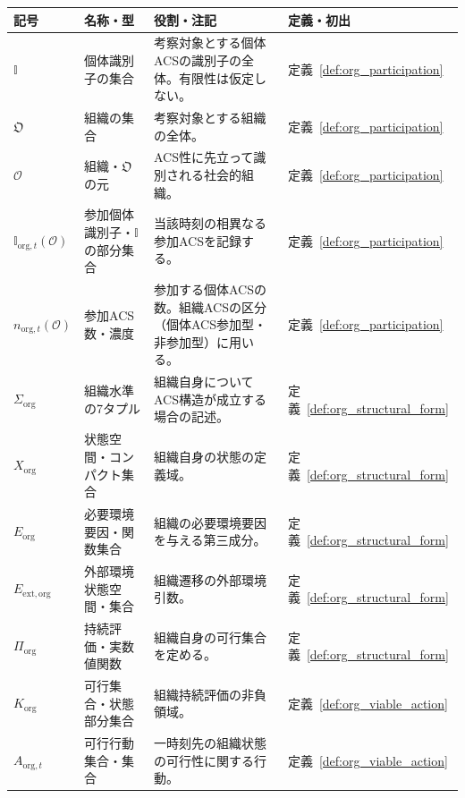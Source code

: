 \begingroup
\small
\setlength{\tabcolsep}{4pt}
\renewcommand{\arraystretch}{1.18}
\begin{longtable}{p{3.0cm} p{3.0cm} p{6.6cm} p{2.0cm}}
\hline
\textbf{記号} & \textbf{名称・型} & \textbf{役割・注記} & \textbf{定義・初出} \\
\hline
\endhead
\hline
\endfoot
$\mathbb{I}$ & 個体識別子の集合 &
考察対象とする個体ACSの識別子の全体。有限性は仮定しない。 &
定義~\ref{def:org_participation} \\[3pt]
$\mathfrak{O}$ & 組織の集合 &
考察対象とする組織の全体。 &
定義~\ref{def:org_participation} \\[3pt]
$\mathcal O$ & 組織・$\mathfrak{O}$ の元 &
ACS性に先立って識別される社会的組織。 &
定義~\ref{def:org_participation} \\[3pt]
$\mathbb{I}_{\mathrm{org},t}(\mathcal O)$ & 参加個体識別子・$\mathbb{I}$ の部分集合 &
当該時刻の相異なる参加ACSを記録する。 &
定義~\ref{def:org_participation} \\[3pt]
$n_{\mathrm{org},t}(\mathcal O)$ & 参加ACS数・濃度 &
参加する個体ACSの数。組織ACSの区分（個体ACS参加型・非参加型）に用いる。 &
定義~\ref{def:org_participation} \\[3pt]
$\Sigma_{\mathrm{org}}$ & 組織水準の7タプル &
組織自身についてACS構造が成立する場合の記述。 &
定義~\ref{def:org_structural_form} \\[3pt]
$X_{\mathrm{org}}$ & 状態空間・コンパクト集合 &
組織自身の状態の定義域。 &
定義~\ref{def:org_structural_form} \\[3pt]
$E_{\mathrm{org}}$ & 必要環境要因・関数集合 &
組織の必要環境要因を与える第三成分。 &
定義~\ref{def:org_structural_form} \\[3pt]
$E_{\mathrm{ext},\mathrm{org}}$ & 外部環境状態空間・集合 &
組織遷移の外部環境引数。 &
定義~\ref{def:org_structural_form} \\[3pt]
$\Pi_{\mathrm{org}}$ & 持続評価・実数値関数 &
組織自身の可行集合を定める。 &
定義~\ref{def:org_structural_form} \\[3pt]
$K_{\mathrm{org}}$ & 可行集合・状態部分集合 &
組織持続評価の非負領域。 &
定義~\ref{def:org_viable_action} \\[3pt]
$A_{\mathrm{org},t}$ & 可行行動集合・集合 &
一時刻先の組織状態の可行性に関する行動。 &
定義~\ref{def:org_viable_action} \\[3pt]
\end{longtable}
\endgroup
